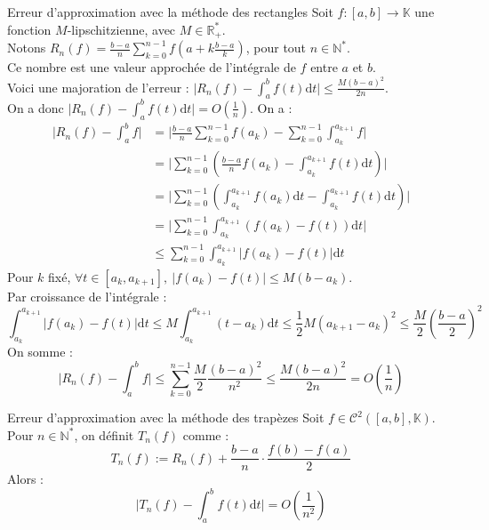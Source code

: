 \documentclass[11pt]{article}
\newcommand*{\K}{\mathbb{K}}
\newcommand*{\R}{\mathbb{R}}
\newcommand*{\N}{\mathbb{N}}
\newcommand*{\m}{\mathcal}
\newcommand{\0}{\varnothing}
\newcommand{\dt}{\textrm{d}t}
\begin{document}
\begin{prop}{Erreur d'approximation avec la méthode des rectangles}{}
    Soit $f:[a,b]\to\K$ une fonction $M$-lipschitzienne, avec $M\in\R^*_+$.\\
    Notons $R_n(f)=\frac{b-a}{n}\sum_{k=0}^{n-1}f(a+k\frac{b-a}{k})$, pour tout $n\in\N^*$.\\
    Ce nombre est une valeur approchée de l'intégrale de $f$ entre $a$ et $b$.\\
    Voici une majoration de l'erreur : $\Big|R_n(f)-\int_a^bf(t)\dt\Big|\leq\frac{M(b-a)^2}{2n}$.\\
    On a donc $\Big|R_n(f)-\int_a^bf(t)\dt\Big|=O(\frac{1}{n})$.
    \tcblower
    On a :
    \begin{align*}
        \Big|R_n(f)-\int_a^bf\Big| &= \Big|\frac{b-a}{n}\sum_{k=0}^{n-1}f(a_k)-\sum^{n-1}_{k=0}\int_{a_k}^{a_{k+1}}f\Big|\\
        &= \Big|\sum_{k=0}^{n-1}\left( \frac{b-a}{n}f(a_k) - \int_{a_k}^{a_{k+1}}f(t)\dt \right)\Big|\\
        &=\Big|\sum_{k=0}^{n-1}\left(\int_{a_k}^{a_{k+1}}f(a_k)\dt-\int_{a_k}^{a_{k+1}}f(t)\dt\right)\Big|\\
        &=\Big|\sum_{k=0}^{n-1}\int_{a_k}^{a_{k+1}}\left(f(a_k)-f(t)\right)\dt\Big|\\
        &\leq \sum_{k=0}^{n-1}\int_{a_k}^{a_{k+1}}\Big|f(a_k)-f(t)\Big|\dt
    \end{align*}
    Pour $k$ fixé, $\forall t \in [a_k,a_{k+1}], ~ |f(a_k)-f(t)|\leq M(b-a_k)$.\\
    Par croissance de l'intégrale :
    \begin{equation*}
        \int_{a_k}^{a_{k+1}}\Big|f(a_k)-f(t)\Big|\dt\leq M\int_{a_k}^{a_{k+1}}(t-a_k)\dt\leq \frac{1}{2}M(a_{k+1}-a_k)^2\leq\frac{M}{2}(\frac{b-a}{2})^2
    \end{equation*}
    On somme :
    \begin{equation*}
        \Big| R_n(f) - \int_a^bf\Big| \leq \sum_{k=0}^{n-1}\frac{M}{2}\frac{(b-a)^2}{n^2}\leq \frac{M(b-a)^2}{2n}=O(\frac{1}{n})
    \end{equation*}
\end{prop}

\begin{prop}{Erreur d'approximation avec la méthode des trapèzes}{}
   Soit $f\in\m{C}^2([a,b],\K)$. Pour $n\in\N^*$, on définit $T_n(f)$ comme :
   \begin{equation*}
        T_n(f):=R_n(f)+\frac{b-a}{n}\cdot\frac{f(b)-f(a)}{2}
   \end{equation*}
   Alors :
   \begin{equation*}
    \Big|T_n(f)-\int_a^bf(t)\dt\Big|=O\left(\frac{1}{n^2}\right)
   \end{equation*}
\end{prop}
\end{document}

